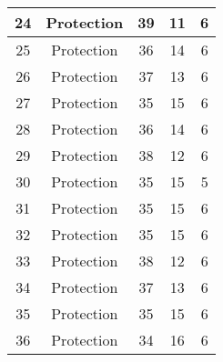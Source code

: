 \documentclass[results.tex]{subfiles}
\begin{document}
\begin{center}
\begin{tabular}{| c || c | c | c | c |}
            \hline
            24                      & Protection                   & 39                     & 11                      & 6                    \\
            \hline
            25                      & Protection                   & 36                     & 14                      & 6                    \\
            \hline
            26                      & Protection                   & 37                     & 13                      & 6                    \\
            \hline
            27                      & Protection                   & 35                     & 15                      & 6                    \\
            \hline
            28                      & Protection                   & 36                     & 14                      & 6                    \\
            \hline
            29                      & Protection                   & 38                     & 12                      & 6                    \\
            \hline
            30                      & Protection                   & 35                     & 15                      & 5                    \\
            \hline
            31                      & Protection                   & 35                     & 15                      & 6                    \\
            \hline
            32                      & Protection                   & 35                     & 15                      & 6                    \\
            \hline
            33                      & Protection                   & 38                     & 12                      & 6                    \\
            \hline
            34                      & Protection                   & 37                     & 13                      & 6                    \\
            \hline
            35                      & Protection                   & 35                     & 15                      & 6                    \\
            \hline
            36                      & Protection                   & 34                     & 16                      & 6                    \\

\end{tabular}
\end{center}
\end{document}

